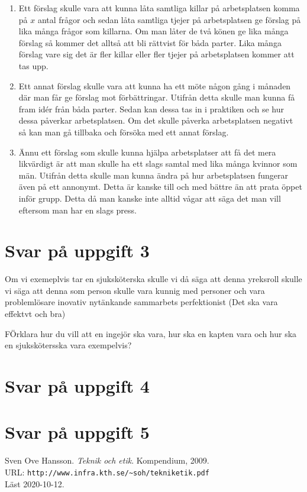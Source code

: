 \documentclass[a4paper,12pt]{article}
\begin{document}
\begin{enumerate}
  \item Ett förslag skulle vara att kunna låta samtliga killar på arbetsplatsen 
  komma på $x$ antal frågor och sedan låta samtliga tjejer på arbetsplatsen ge
  förslag på lika många frågor som killarna. Om man låter de två könen ge lika
  många förslag så kommer det alltså att bli rättvist för båda parter. Lika många
  förslag vare sig det är fler killar eller fler tjejer på arbetsplatsen kommer 
  att tas upp.
  \item Ett annat förslag skulle vara att kunna ha ett möte någon gång i 
  månaden där man får ge förslag mot förbättringar. Utifrån detta skulle man 
  kunna få fram idér från båda parter. Sedan kan dessa tas in i praktiken och 
  se hur dessa påverkar arbetsplatsen. Om det skulle påverka arbetsplatsen 
  negativt så kan man gå tillbaka och försöka med ett annat förslag.
  \item Ännu ett förslag som skulle kunna hjälpa arbetsplatser att få det mera
  likvärdigt är att man skulle ha ett slags samtal med lika många kvinnor som män.
  Utifrån detta skulle man kunna ändra på hur arbetsplatsen fungerar även på ett
  annonymt. Detta är kanske till och med bättre än att prata öppet inför grupp.
  Detta då man kanske inte alltid vågar att säga det man vill eftersom man har 
  en slags press. 
\end{enumerate}
  
\section*{Svar på uppgift 3}



Om vi exemeplvis tar en sjuksköterska skulle vi då säga att denna yreksroll skulle
vi säga att denna som person skulle vara kunnig med personer och vara 
problemlösare
inovativ
nytänkande
sammarbets
perfektionist (Det ska vara effektvt och bra)

FÖrklara hur du vill att en ingejör ska vara, hur ska en kapten vara och hur ska en sjukskötersska vara exempelvis?



\section*{Svar på uppgift 4}




\section*{Svar på uppgift 5}




\begin{thebibliography}{99}
   Sven Ove Hansson. \emph{Teknik och etik}.
    Kompendium, 2009. \\
    URL: \verb|http://www.infra.kth.se/~soh/tekniketik.pdf| \\
    Läst 2020-10-12. 
  \end{thebibliography}
\end{document}
